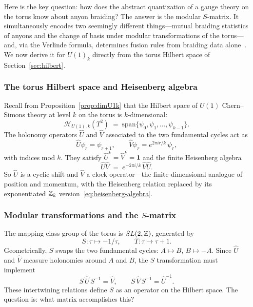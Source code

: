 Here is the key question: how does the abstract quantization of a gauge theory
on the torus know about anyon braiding?  The answer is the modular $S$-matrix.
It simultaneously encodes two seemingly different things---mutual braiding
statistics of anyons and the change of basis under modular transformations of
the torus---and, via the Verlinde formula, determines fusion rules from braiding
data alone~\cite{Witten1989Jones}.  We now derive it for $U(1)_k$ directly from
the torus Hilbert space of Section~\ref{sec:hilbert}.

\subsubsection*{The torus Hilbert space and Heisenberg algebra}

Recall from Proposition~\ref{prop:dimU1k} that the Hilbert space of
$U(1)$ Chern--Simons theory at level $k$ on the torus is $k$-dimensional:
\begin{equation}
\label{eq:u1k-hilbert-space}
    \mathcal{H}_{U(1),k}(T^2) \;=\; \mathrm{span}\{\psi_0, \psi_1, \ldots, \psi_{k-1}\}.
\end{equation}
The holonomy operators $\hat U$ and $\hat V$ associated to the two
fundamental cycles act as
\begin{equation}
\label{eq:UV-action}
    \hat U \psi_r = \psi_{r+1}, \qquad
    \hat V \psi_r = e^{2\pi i r/k}\, \psi_r,
\end{equation}
with indices mod $k$.  They satisfy $\hat U^k = \hat V^k = \mathbf{1}$ and the
finite Heisenberg algebra
\begin{equation}
\label{eq:heisenberg-algebra}
    \hat U \hat V \;=\; e^{-2\pi i/k}\, \hat V \hat U.
\end{equation}
So $\hat U$ is a cyclic shift and $\hat V$ a clock operator---the
finite-dimensional analogue of position and momentum, with the Heisenberg
relation replaced by its exponentiated $\mathbb{Z}_k$
version~\eqref{eq:heisenberg-algebra}.

\subsubsection*{Modular transformations and the $S$-matrix}

The mapping class group of the torus is $SL(2,\mathbb{Z})$, generated by
\begin{equation}
\label{eq:modular-generators}
    S : \tau \mapsto -1/\tau, \qquad T : \tau \mapsto \tau + 1.
\end{equation}
Geometrically, $S$ swaps the two fundamental cycles: $A \mapsto B$,
$B \mapsto -A$.  Since $\hat U$ and $\hat V$ measure holonomies around $A$
and $B$, the $S$ transformation must implement
\begin{equation}
\label{eq:s-intertwining}
    S\, \hat U\, S^{-1} = \hat V, \qquad
    S\, \hat V\, S^{-1} = \hat U^{-1}.
\end{equation}
These intertwining relations define $S$ as an operator on the Hilbert space.
The question is: what matrix accomplishes this?

